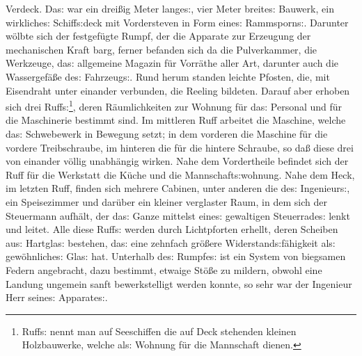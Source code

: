 \documentclass[oneside,12pt]{book}
\newcommand{\s}{s:}
\begin{document}
Verdeck. Da{\s} war ein drei{\ss}ig Meter lange{\s}, vier Meter
breite{\s} Bauwerk, ein wirkliche{\s} Schiff{\s}deck mit Vordersteven
in Form eine{\s} Rammsporn{\s}. Darunter w\"olbte sich der
festgef\"ugte Rumpf, der die Apparate zur Erzeugung der mechanischen
Kraft barg, ferner befanden sich da die Pulverkammer, die Werkzeuge,
da{\s} allgemeine Magazin f\"ur Vorr\"athe aller Art, darunter auch
die Wassergef\"a{\ss}e de{\s} Fahrzeug{\s}. Rund herum standen
leichte Pfosten, die, mit Eisendraht unter einander verbunden, die
Reeling bildeten. Darauf aber erhoben sich drei
Ruff{\s}\footnote[1]{\frakfamily Ruff{\s} nennt man auf Seeschiffen die
auf Deck stehenden kleinen Holzbauwerke, welche al{\s} Wohnung f\"ur
die Mannschaft dienen.}, deren R\"aumlichkeiten zur Wohnung f\"ur
da{\s} Personal und f\"ur die Maschinerie bestimmt sind. Im mittleren
Ruff arbeitet die Maschine, welche da{\s} Schwebewerk in Bewegung
setzt; in dem vorderen die Maschine f\"ur die vordere Treibschraube,
im hinteren die f\"ur die hintere Schraube, so da{\ss} diese drei von
einander v\"ollig unabh\"angig wirken. Nahe dem Vordertheile befindet
sich der Ruff f\"ur die Werkstatt die K\"uche und die
Mannschaft{\s}wohnung. Nahe dem Heck, im letzten Ruff, finden sich
mehrere Cabinen, unter anderen die de{\s} Ingenieur{\s}, ein
Speisezimmer und dar\"uber ein kleiner verglaster Raum, in dem sich
der Steuermann aufh\"alt, der da{\s} Ganze mittelst eine{\s}
gewaltigen Steuerrade{\s} lenkt und leitet. Alle diese Ruff{\s}
werden durch Lichtpforten erhellt, deren Scheiben au{\s} Hartgla{\s}
bestehen, da{\s} eine zehnfach gr\"o{\ss}ere
Widerstand{\s}f\"ahigkeit al{\s} gew\"ohnliche{\s} Gla{\s} hat.
Unterhalb de{\s} Rumpfe{\s} ist ein System von biegsamen Federn
angebracht, dazu bestimmt, etwaige St\"o{\ss}e zu mildern, obwohl
eine Landung ungemein sanft bewerkstelligt werden konnte, so sehr war
der Ingenieur Herr seine{\s} Apparate{\s}.
\end{document}
